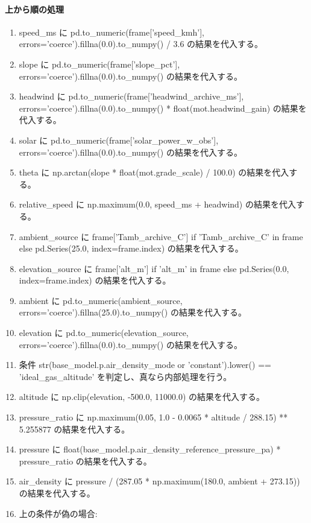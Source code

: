 \documentclass[a4paper,11pt]{article}
\begin{document}
            \paragraph{上から順の処理}
            \begin{enumerate}[leftmargin=1.8em]
            \item speed\_ms に pd.to\_numeric(frame['speed\_kmh'], errors='coerce').fillna(0.0).to\_numpy() / 3.6 の結果を代入する。
\item slope に pd.to\_numeric(frame['slope\_pct'], errors='coerce').fillna(0.0).to\_numpy() の結果を代入する。
\item headwind に pd.to\_numeric(frame['headwind\_archive\_ms'], errors='coerce').fillna(0.0).to\_numpy() * float(mot.headwind\_gain) の結果を代入する。
\item solar に pd.to\_numeric(frame['solar\_power\_w\_obs'], errors='coerce').fillna(0.0).to\_numpy() の結果を代入する。
\item theta に np.arctan(slope * float(mot.grade\_scale) / 100.0) の結果を代入する。
\item relative\_speed に np.maximum(0.0, speed\_ms + headwind) の結果を代入する。
\item ambient\_source に frame['Tamb\_archive\_C'] if 'Tamb\_archive\_C' in frame else pd.Series(25.0, index=frame.index) の結果を代入する。
\item elevation\_source に frame['alt\_m'] if 'alt\_m' in frame else pd.Series(0.0, index=frame.index) の結果を代入する。
\item ambient に pd.to\_numeric(ambient\_source, errors='coerce').fillna(25.0).to\_numpy() の結果を代入する。
\item elevation に pd.to\_numeric(elevation\_source, errors='coerce').fillna(0.0).to\_numpy() の結果を代入する。
\item 条件 str(base\_model.p.air\_density\_mode or 'constant').lower() == 'ideal\_gas\_altitude' を判定し、真なら内部処理を行う。
\item   altitude に np.clip(elevation, -500.0, 11000.0) の結果を代入する。
\item   pressure\_ratio に np.maximum(0.05, 1.0 - 0.0065 * altitude / 288.15) ** 5.255877 の結果を代入する。
\item   pressure に float(base\_model.p.air\_density\_reference\_pressure\_pa) * pressure\_ratio の結果を代入する。
\item   air\_density に pressure / (287.05 * np.maximum(180.0, ambient + 273.15)) の結果を代入する。
\item   上の条件が偽の場合:

\end{enumerate}
\end{document}

